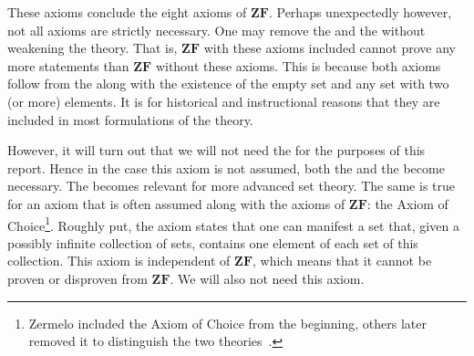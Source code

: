 \documentclass[../main.tex]{subfiles}
\begin{document}
These axioms conclude the eight axioms of $\mathbf{ZF}$. Perhaps unexpectedly however, not all axioms are strictly necessary. One may remove the  and the  without weakening the theory. That is, $\mathbf{ZF}$ with these axioms included cannot prove any more statements than $\mathbf{ZF}$ without these axioms. This is because both axioms follow from the  along with the existence of the empty set and any set with two (or more) elements. It is for historical and instructional reasons that they are included in most formulations of the theory.

However, it will turn out that we will not need the  for the purposes of this report. Hence in the case this axiom is not assumed, both the  and the  become necessary. The  becomes relevant for more advanced set theory. The same is true for an axiom that is often assumed along with the axioms of $\mathbf{ZF}$: the Axiom of Choice\footnote{Zermelo included the Axiom of Choice from the beginning, others later removed it to distinguish the two theories~\cite{Zermelo1908}.}. Roughly put, the axiom states that one can manifest a set that, given a possibly infinite collection of sets, contains one element of each set of this collection. This axiom is independent of $\mathbf{ZF}$, which means that it cannot be proven or disproven from $\mathbf{ZF}$. We will also not need this axiom.
\end{document}

